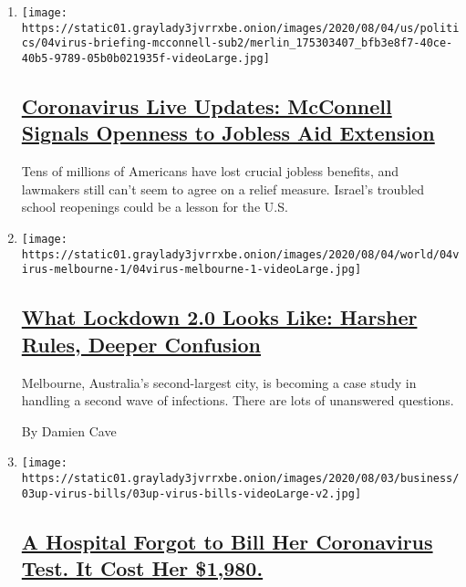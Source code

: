 \begin{enumerate}
\def\labelenumi{\arabic{enumi}.}
\item
  \texttt{[image: https://static01.graylady3jvrrxbe.onion/images/2020/08/04/us/politics/04virus-briefing-mcconnell-sub2/merlin\_175303407\_bfb3e8f7-40ce-40b5-9789-05b0b021935f-videoLarge.jpg]}

  \hypertarget{coronavirus-live-updates-mcconnell-signals-openness-to-jobless-aid-extension}{%
  \subsection{\texorpdfstring{\href{/2020/08/04/world/coronavirus-cases.html}{Coronavirus
  Live Updates: McConnell Signals Openness to Jobless Aid
  Extension}}{Coronavirus Live Updates: McConnell Signals Openness to Jobless Aid Extension}}\label{coronavirus-live-updates-mcconnell-signals-openness-to-jobless-aid-extension}}

  Tens of millions of Americans have lost crucial jobless benefits, and
  lawmakers still can't seem to agree on a relief measure. Israel's
  troubled school reopenings could be a lesson for the U.S.
\item
  \texttt{[image: https://static01.graylady3jvrrxbe.onion/images/2020/08/04/world/04virus-melbourne-1/04virus-melbourne-1-videoLarge.jpg]}

  \hypertarget{what-lockdown-20-looks-like-harsher-rules-deeper-confusion}{%
  \subsection{\texorpdfstring{\href{/2020/08/04/world/australia/coronavirus-melbourne-lockdown.html}{What
  Lockdown 2.0 Looks Like: Harsher Rules, Deeper
  Confusion}}{What Lockdown 2.0 Looks Like: Harsher Rules, Deeper Confusion}}\label{what-lockdown-20-looks-like-harsher-rules-deeper-confusion}}

  Melbourne, Australia's second-largest city, is becoming a case study
  in handling a second wave of infections. There are lots of unanswered
  questions.

  By Damien Cave
\item
  \texttt{[image: https://static01.graylady3jvrrxbe.onion/images/2020/08/03/business/03up-virus-bills/03up-virus-bills-videoLarge-v2.jpg]}

  \hypertarget{a-hospital-forgot-to-bill-her-coronavirus-test-it-cost-her-1980}{%
  \subsection{\texorpdfstring{\href{/2020/08/03/upshot/nj-coronavirus-medical-bill.html}{A
  Hospital Forgot to Bill Her Coronavirus Test. It Cost Her
  \$1,980.}}{A Hospital Forgot to Bill Her Coronavirus Test. It Cost Her \$1,980.}}\label{a-hospital-forgot-to-bill-her-coronavirus-test-it-cost-her-1980}}


\end{enumerate}
